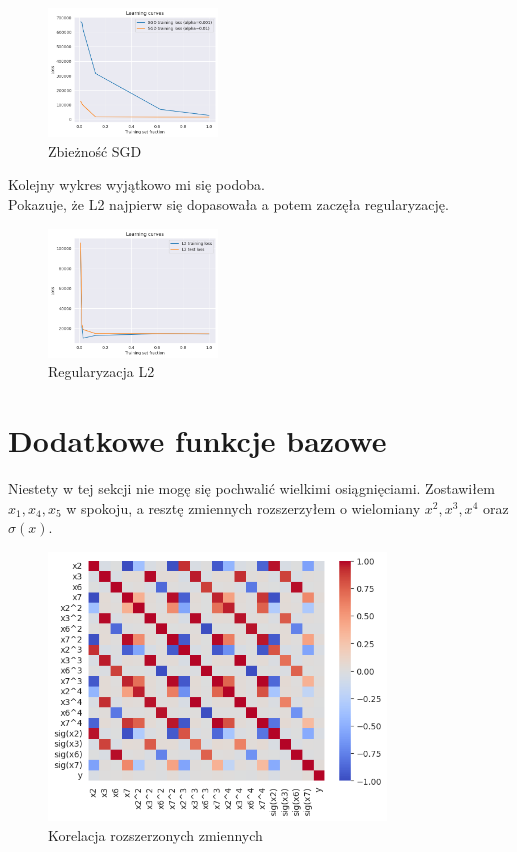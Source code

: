 \documentclass[a4paper,12pt]{article}
\begin{document}
\begin{figure}[h!]
    \centering
    \includegraphics[width=0.4\textwidth]{sgd_converge_time.png}
    \caption{Zbieżność SGD}
\end{figure}

\newpage

\!\!\!\!\!\!\!\!\!Kolejny wykres wyjątkowo mi się podoba. \\
Pokazuje, że L2 najpierw się dopasowała a potem zaczęła regularyzację.
\begin{figure}[h!]
    \centering
    \includegraphics[width=0.4\textwidth]{l2_reg.png}
    \caption{Regularyzacja L2}
\end{figure}

\section{Dodatkowe funkcje bazowe}
Niestety w tej sekcji nie mogę się pochwalić wielkimi osiągnięciami. Zostawiłem $x_1, x_4, x_5$ w spokoju, a resztę zmiennych rozszerzyłem o wielomiany $x^2, x^3, x^4$ oraz $\sigma(x)$.
\begin{figure}[h!]
    \centering
    \includegraphics[width=0.8\textwidth]{aug_corr.png}
    \caption{Korelacja rozszerzonych zmiennych}
\end{figure}
\end{document}
